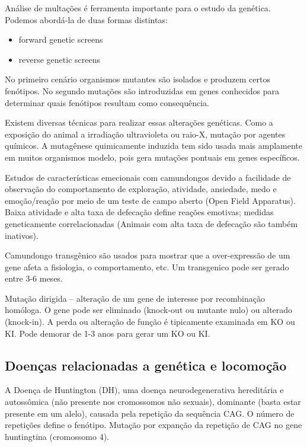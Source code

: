 \documentclass[
	article,			%
	12pt,				%
	oneside,			%
	a4paper,			%
	english,			%
	brazil,				%
	sumario=tradicional
	]{abntex2}
\begin{document}
Análise de multações é ferramenta importante para o estudo da genética. Podemos abordá-la de duas formas distintas:
\begin{itemize}
    \item forward genetic screens
    \item reverse genetic screens
\end{itemize}
No primeiro cenário organismos mutantes são isolados e produzem certos fenótipos.
No segundo mutações são introduzidas em genes conhecidos para determinar quais fenótipos resultam como consequência.

Existem diversas técnicas para realizar essas alterações genéticas. Como a exposição do animal a irradiação ultravioleta ou raio-X, mutação por agentes químicos.
A mutagênese quimicamente induzida tem sido usada mais amplamente em muitos organismos modelo, pois gera mutações pontuais em genes específicos.

Estudos de características emecionais com camundongos devido a facilidade de observação do comportamento de exploração,	atividade,	ansiedade,	medo	e emoção/reação	por meio de	um teste de	campo	aberto	(Open	Field	
Apparatus). Baixa	atividade	e	alta taxa	de	defecação	define	 reações	emotivas;	 medidas	geneticamente correlacionadas	(Animais	com	alta taxa	de	defecação	são	também	inativos).	

Camundongo	transgênico	são usados	para	mostrar	que	a	over-expressão	de	um	gene	afeta	a	fisiologia,	o	
comportamento,	etc. Um	transgenico	pode ser	 gerado	entre	3-6	meses.

Mutação	dirigida	–	alteração	de	um	gene	de	interesse	por recombinação	homóloga. O	gene	pode	ser	eliminado (knock-out	ou	mutante	nulo)	ou	alterado (knock-in).		A	perda	ou	alteração	de	função	é	tipicamente	examinada	em	KO	ou KI. Pode	demorar	de	1-3	anos para	gerar	um	KO	ou	KI.

\subsection{Doenças relacionadas a genética e locomoção}
A Doença de Huntington (DH), uma doença neurodegenerativa hereditária e autossômica (não presente nos cromossomos não sexuais), dominante (basta estar presente em um alelo), causada pela repetição da sequência CAG. O número de repetições define o fenótipo.
Mutação por expanção da repetição de CAG no gene huntingtina (cromossomo 4).

\end{document}
